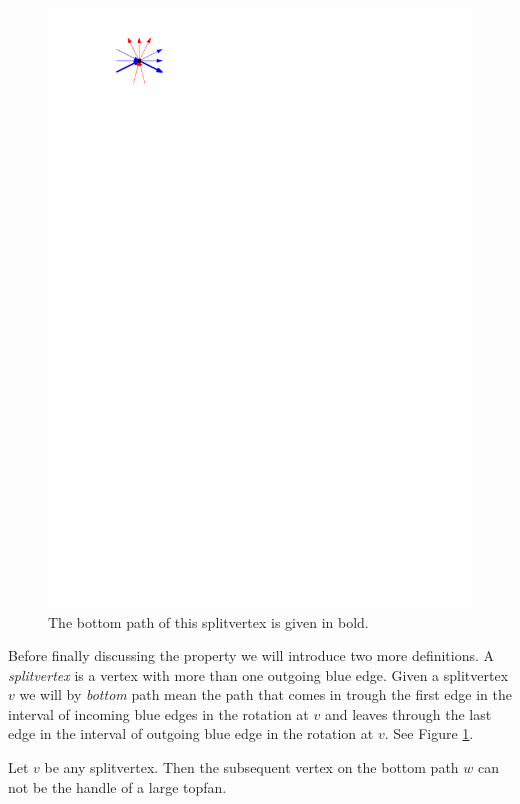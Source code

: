     \begin{figure}
      \centering
      \includegraphics[scale=.9]{unifiedAlgo/img/sweep/bottompath.pdf}
      \caption{The bottom path of this splitvertex is given in bold.}
      \label{fig:sweep:bottomPath}
    \end{figure}

    Before finally discussing the property we will introduce two more definitions.
    A \emph{splitvertex} is a vertex with more than one outgoing blue edge.
    Given a splitvertex $v$ we will by \emph{bottom} path mean the path that comes in trough the first edge in the interval of incoming blue edges in the rotation at $v$ and leaves through the last edge in the interval of outgoing blue edge in the rotation at $v$.
    See Figure \ref{fig:sweep:bottomPath}.

    \begin{lemma}
      \label{lm:sweep:NoTwoSplitsAboveEachOther}
      Let $v$ be any splitvertex. Then the subsequent vertex on the bottom path $w$ can not be the handle of a large topfan.
    \end{lemma}

